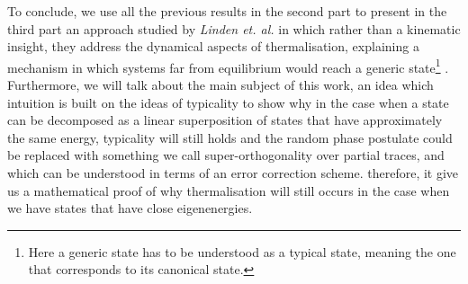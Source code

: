 \newline
To conclude, we use all the previous results in the second part to present in the third part an approach studied by \textit{Linden et. al.} \cite{linden_quantum_2009} in which rather than a kinematic insight, they address the dynamical aspects of thermalisation, explaining a mechanism in which systems far from equilibrium would reach a generic state\footnote{Here a generic state has to be understood as a typical state, meaning the one that corresponds to its canonical state.} \cite{linden_quantum_2009}. Furthermore, we will talk about the main subject of this work, an idea which intuition is built on the ideas of typicality to show why in the case when a state can be decomposed as a linear superposition of states that have approximately the same energy, typicality will still holds and the random phase postulate could be replaced with something we call super-orthogonality over partial traces, and which can be understood in terms of an error correction scheme. therefore, it give us a mathematical proof of why thermalisation will still occurs in the case when we have states that have close eigenenergies.

